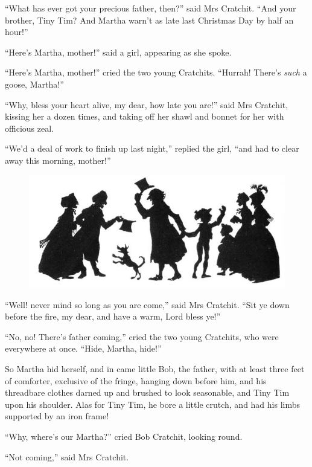 \documentclass[paper=5.5in:8.5in,BCOR=10mm,twoside,DIV=15,12pt,usegeometry,openany]{scrbook} %
\begin{document}
\enquote{What has ever got your precious father, then?} said Mrs Cratchit. \enquote{And your brother, Tiny Tim? And Martha warn't as late last Christmas Day by half an hour!}

\enquote{Here's Martha, mother!} said a girl, appearing as she spoke.

\enquote{Here's Martha, mother!} cried the two young Cratchits. \enquote{Hurrah! There's \textit{such} a goose, Martha!}

\enquote{Why, bless your heart alive, my dear, how late you are!} said Mrs Cratchit, kissing her a dozen times, and taking off her shawl and bonnet for her with officious zeal.

\enquote{We'd a deal of work to finish up last night,} replied the girl, \enquote{and had to clear away this morning, mother!}



\cleardoubleevenemptypage
\begin{figure}[t]
\centering
\includegraphics[width=\linewidth]{gs109}
\end{figure}

\enquote{Well! never mind so long as you are come,} said Mrs Cratchit. \enquote{Sit ye down before the fire, my dear, and have a warm, Lord bless ye!}

\enquote{No, no! There's father coming,} cried the two young Cratchits, who were everywhere at once. \enquote{Hide, Martha, hide!}

So Martha hid herself, and in came little Bob, the father, with at least three feet of comforter, exclusive of the fringe, hanging down before him, and his threadbare clothes darned up and brushed to look seasonable, and Tiny Tim upon his shoulder. Alas for Tiny Tim, he bore a little crutch, and had his limbs supported by an iron frame!


\enquote{Why, where's our Martha?} cried Bob Cratchit, looking round.

\enquote{Not coming,} said Mrs Cratchit.
\end{document}
